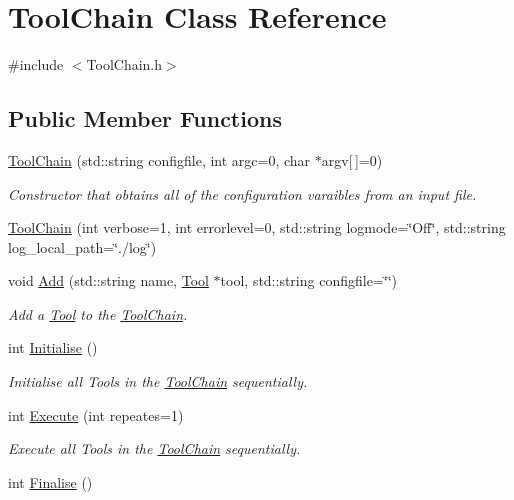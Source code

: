 \hypertarget{classToolChain}{\section{Tool\-Chain Class Reference}
\label{classToolChain}
}


{\ttfamily \#include $<$Tool\-Chain.\-h$>$}

\subsection*{Public Member Functions}
\begin{DoxyCompactItemize}
\item 
\hyperlink{classToolChain_a133e224899a743ee4a679396f8569bf9}{Tool\-Chain} (std\-::string configfile, int argc=0, char $\ast$argv\mbox{[}$\,$\mbox{]}=0)
\begin{DoxyCompactList}\small\item\em Constructor that obtains all of the configuration varaibles from an input file. \end{DoxyCompactList}\item 
\hyperlink{classToolChain_a04186696e28e3193b2fc756a89d14882}{Tool\-Chain} (int verbose=1, int errorlevel=0, std\-::string logmode=\char`\"{}Off\char`\"{}, std\-::string log\-\_\-local\-\_\-path=\char`\"{}./log\char`\"{})
\item 
void \hyperlink{classToolChain_a4da0c02154a0597704e58836d6607e61}{Add} (std\-::string name, \hyperlink{classTool}{Tool} $\ast$tool, std\-::string configfile=\char`\"{}\char`\"{})
\begin{DoxyCompactList}\small\item\em Add a \hyperlink{classTool}{Tool} to the \hyperlink{classToolChain}{Tool\-Chain}. \end{DoxyCompactList}\item 
\hypertarget{classToolChain_a341f343926341b82a29c586a7b9683af}{int \hyperlink{classToolChain_a341f343926341b82a29c586a7b9683af}{Initialise} ()}\label{classToolChain_a341f343926341b82a29c586a7b9683af}

\begin{DoxyCompactList}\small\item\em Initialise all Tools in the \hyperlink{classToolChain}{Tool\-Chain} sequentially. \end{DoxyCompactList}\item 
int \hyperlink{classToolChain_a303e299293fd4d3a5e91865e04898e52}{Execute} (int repeates=1)
\begin{DoxyCompactList}\small\item\em Execute all Tools in the \hyperlink{classToolChain}{Tool\-Chain} sequentially. \end{DoxyCompactList}\item 
\hypertarget{classToolChain_a3828756135773fb9ca4b361a47296dd9}{int \hyperlink{classToolChain_a3828756135773fb9ca4b361a47296dd9}{Finalise} ()}\label{classToolChain_a3828756135773fb9ca4b361a47296dd9}


\end{DoxyCompactItemize}
